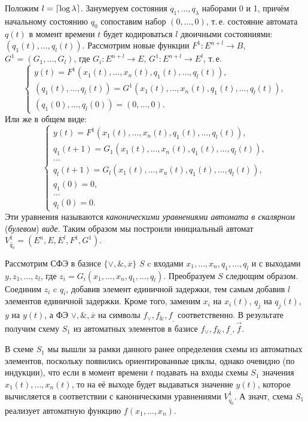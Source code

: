 \begin{definition}
    Положим $l = \left\lceil {\log \lambda} \right\rceil$. Занумеруем состояния $q_1, \ldots, q_\lambda$ наборами 0 и 1, причём начальному состоянию $q_0$ сопоставим набор $(0, \ldots, 0)$, т.\,е. состояние автомата $q(t)$ в момент времени $t$ будет кодироваться $l$ двоичными состояниями: $(q_1(t), \ldots, q_l(t))$. Рассмотрим новые функции $F^1:E^{n+l}\to B$, $G^1 = (G_1,\ldots, G_l)$, где $G_i: E^{n+l}\to E$, $G^1:E^{n+l}\to E^l$, т.\,е.
    \[
        \begin{cases}
            y(t) = F^1(x_1(t), \ldots, x_n(t), q_1(t), \ldots, q_l(t)),\\
            (q_1(t), \ldots, q_l(t)) = G^1(x_1(t), \ldots, x_n(t), q_1(t), \ldots, q_l(t)),\\
            (q_1(0), \ldots, q_l(0)) = (0,\ldots, 0).
        \end{cases}
    \]
    Или же в общем виде:
    \[
        \begin{cases}
            y(t) = F^1(x_1(t), \ldots, x_n(t), q_1(t), \ldots, q_l(t)),\\
            q_1(t+1) = G_1(x_1(t), \ldots, x_n(t), q_1(t), \ldots, q_l(t)),\\
            \ldots\\
            q_l(t+1) = G_l(x_1(t), \ldots, x_n(t), q_1(t), \ldots, q_l(t)),\\
            q_1(0) = 0,\\
            \ldots\\
            q_l(0) = 0.
        \end{cases}
    \]
    Эти уравнения называются \textit{каноническими уравнениями автомата в скалярном} (\textit{булевом}) \textit{виде}. Таким образом мы построили инициальный автомат $V^1_{\widetilde{q_0}} = (E^n, E, E^l, F^1, G^1)$.
\end{definition}

Рассмотрим СФЭ в базисе $\{\vee, \&, \overline{x}\}$ $S$ c входами $x_1, \ldots, x_n, q_1, \ldots, q_l$ и с выходами $y, z_1, \ldots, z_l$, где $z_i = G_i(x_1, \ldots, x_n, q_1, \ldots, q_l)$. Преобразуем $S$ следющим образом. Соединим $z_i$ c $q_i$, добавив элемент единичной задержки, тем самым добавив $l$ элементов единичной задержки. Кроме того, заменим $x_i$ на $x_i(t)$, $q_j$ на $q_j(t)$, $y$ на $y(t)$, а ФЭ $\vee, \&, \overline{x}$ на символы $f_\vee, f_\&, f_\_$ соответственно. В результате получим схему $S_1$ из автоматных элементов в базисе $f_\vee, f_\&, f_\_, \vec{f}$.

\begin{remark}
    В схеме $S_1$ мы вышли за рамки данного ранее определения схемы из автоматных элементов, поскольку появились ориентированные циклы, однако очевидно (по индукции), что если в момент времени $t$ подавать на входы схемы $S_1$ значения $x_1(t), \ldots, x_n(t)$, то на её выходе будет выдаваться значение $y(t)$, которое вычисляется в соответствии с каноническими уравнениями $V^1_{\widetilde{q_0}}$. А значт, схема $S_1$ реализует автоматную функцию $f(x_1, \ldots, x_n)$.
\end{remark}

